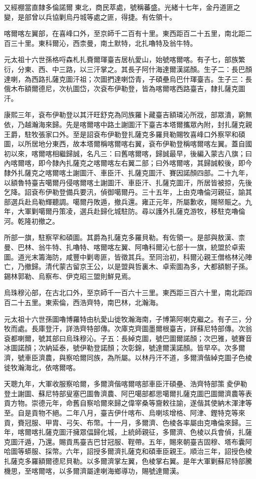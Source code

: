 \begin{pinyinscope}
又經棚當直隸多倫諾爾東北，商民萃處，號稱蕃盛。光緒十七年，金丹道匪之變，是部曾以兵協剿烏丹城等處之匪，得捷。有佐領十。

喀爾喀左翼部，在喜峰口外，至京師千二百有十里。東西距百二十五里，南北距二百三十里。東科爾沁，西柰曼，南土默特，北扎嚕特及翁牛特。

元太祖十六世孫格哷森札扎賚爾琿臺吉居杭愛山，始號喀爾喀。有子七，部族繁衍，分東、西、中三路，以三汗掌之。其長子阿什海達爾漢諾顏。生子二：長巴顏達喇，為西路扎薩克圖汗祖；次圖捫達喇岱青，子碩壘烏巴什琿臺吉。生子三：長俄木布額爾德尼，次杭圖岱，次袞布伊勒登，皆為喀爾喀西路臺吉，隸扎薩克圖汗。

康熙三年，袞布伊勒登以其汗旺舒克為同族羅卜藏臺吉額璘沁所戕，部眾潰，窮無依，乃越瀚海來歸。先是喀爾喀中路土謝圖汗下臺吉本塔爾攜眾內附，封扎薩克親王爵，駐牧張家口外。至是詔袞布伊勒登扎薩克多羅貝勒賜牧喜峰口外察罕和碩圖，以所居地分東西，故本塔爾稱喀爾喀右翼，袞布伊勒登稱喀爾喀左翼。蓋自國初以來，喀爾喀相繼歸誠，名凡三：曰舊喀爾喀，歸誠最早，後編入蒙古八旗；曰內喀爾喀，即今隸內扎薩克之喀爾喀左右翼二部；曰外喀爾喀，其歸誠較後，即今隸外扎薩克之喀爾喀土謝圖汗、車臣汗、扎薩克圖汗、賽因諾顏四部。二十九年，以額魯特臺吉噶爾丹侵喀爾喀土謝圖汗、車臣汗、扎薩克圖汗，所居皆被掠，先後乞降。詔袞布伊勒登備兵要汛，偵御噶爾丹。三十五年，上由克嚕倫河親征，諭其部選兵赴烏勒輝聽調。噶爾丹敗遁，撤兵還。雍正元年，所屬歉收，賜帑賑之。九年，大軍剿噶爾丹策凌，選兵赴歸化城駐防。尋以護外扎薩克游牧，移駐克嚕倫河。乾隆初撤之。

所部一旗，駐察罕和碩圖。其爵為扎薩克多羅貝勒。有佐領一。是部與敖漢、柰曼、巴林、翁牛特、扎嚕特、喀爾喀左翼、阿嚕科爾沁七部十一旗，統盟於卓索圖。道光末籌海防，咸豐中剿粵匪，皆徵其兵。至同治初，科爾沁親王僧格林沁陣亡，乃撤歸。清代蒙古留京王公，以是盟與哲裏木、卓索圖為多，大都額駙子孫。錫林郭勒、烏察布、伊克昭三盟則鮮見焉。

烏珠穆沁部，在古北口外，至京師千一百六十三里。東西距三百六十里，南北距四百二十五里。東索倫，西浩齊特，南巴林，北瀚海。

元太祖十六世孫圖嚕博羅特由杭愛山徙牧瀚海南，子博第阿喇克繼之。有子三，分牧而處。長庫登汗，詳浩齊特部傳。次庫克齊圖墨爾根臺吉，詳蘇尼特部傳。次翁袞都喇爾，號其部曰烏珠穆沁。子五：長綽克圖，號巴圖爾諾顏；次巴雅，號賽音冰圖諾顏；次納延泰，號伊勒登諾顏；次彰錦，號達爾漢諾顏。皆早卒。次多爾濟，號車臣濟農，與察哈爾同族，為所屬。以林丹汗不道，多爾濟偕綽克圖子色棱徙牧瀚海北，依喀爾喀。

天聰九年，大軍收服察哈爾，多爾濟偕喀爾喀部車臣汗碩壘、浩齊特部策夌伊勒登土謝圖、蘇尼特部叟塞巴圖魯濟農、阿巴噶部都思噶爾扎薩克圖巴圖爾濟農等表貢方物。崇德元年，命舊自察哈爾來歸之偉宰桑等齎敕往諭，遂偕其使納木渾津等至。自是貢物不絕。二年八月，臺吉伊什喀布、烏喇垓增格、阿津、鏗特克等來貢，賚冠服、甲胄、弓矢、布幣。十一月，多爾濟、色棱各率屬由克嚕倫來歸。三年，喀爾喀扎薩克圖汗擁眾偪歸化城，上統師親征，多爾濟、色棱以兵會偵，扎薩克圖汗遁，乃還。賜貢馬臺吉巴甘冠服、鞓帶。五年，賜來朝臺吉固穆、塔布囊阿哈圖等蟒服、採幣。六年，詔授多爾濟扎薩克和碩車臣親王。順治三年，詔授色棱扎薩克多羅額爾德尼貝勒。以多爾濟掌左翼，色棱掌右翼。是年大軍剿蘇尼特部騰機思，至喀爾喀，以多爾濟屬達喇海鄉導功，賜號達爾漢。


\end{pinyinscope}
